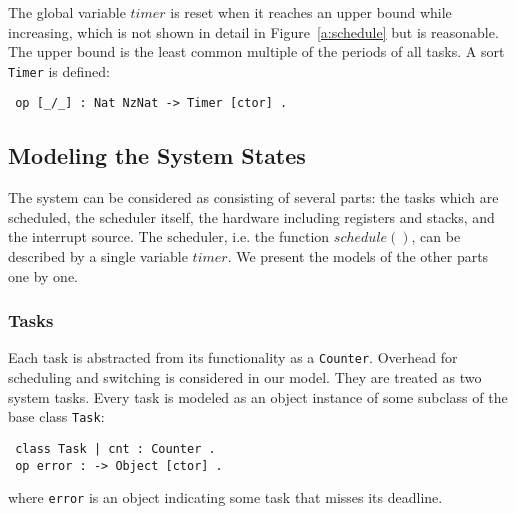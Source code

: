 \documentclass[10pt,journal]{IEEEtran}
\newcommand{\hide}[1]{\ignorespaces}
\begin{document}
\hide{
At last, to make our model checkable by untimed model checking, it is
reasonable to reset the global variable $timer$ when it reaches an
upperbound while increasing (see Line~\ref{l:timer} in
Figure~\ref{a:schedule}) in the model. Then $timer$ is of sort
\verb|Timer| and the upperbound would be the least common multiple of
the periods of all tasks.}

The global variable $timer$ is reset when it reaches an upper bound
while increasing, which is not shown in detail in
Figure~\ref{a:schedule} but is reasonable. The upper bound is the
least common multiple of the periods of all tasks. A sort \verb|Timer|
is defined:
\begin{verbatim}
 op [_/_] : Nat NzNat -> Timer [ctor] .
\end{verbatim}

\subsection{Modeling the System States}
The system can be considered as consisting of several parts: the tasks
which are scheduled, the scheduler itself, the hardware including
registers and stacks, and the interrupt source. The scheduler,
i.e. the function $schedule()$, can be described by a single variable
$timer$. We present the models of the other parts one by one.

\subsubsection{Tasks}
Each task is abstracted from its functionality as a \verb|Counter|.
Overhead for scheduling and switching is considered in our model. They
are treated as two system tasks. Every task is modeled as an object
instance of some subclass of the base class \verb|Task|:
\begin{verbatim}
 class Task | cnt : Counter .
 op error : -> Object [ctor] .
\end{verbatim}
where \verb|error| is an object indicating some task that misses its
deadline.
\end{document}
